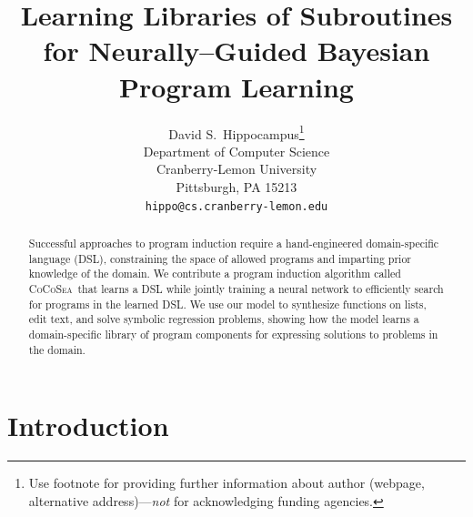 \documentclass{article}
\title{Learning Libraries of Subroutines for Neurally--Guided Bayesian Program Learning}
\author{
  David S.~Hippocampus\thanks{Use footnote for providing further
    information about author (webpage, alternative
    address)---\emph{not} for acknowledging funding agencies.} \\
  Department of Computer Science\\
  Cranberry-Lemon University\\
  Pittsburgh, PA 15213 \\
  \texttt{hippo@cs.cranberry-lemon.edu} \\
}
\newcommand{\system}{\textsc{CoCoSea}~}
\begin{document}

\maketitle

\begin{abstract}
  Successful approaches to program induction require a hand-engineered
  domain-specific language (DSL), constraining the space of allowed
  programs and imparting prior knowledge of the domain.  We contribute
  a program induction algorithm called \system that learns a DSL while
  jointly training a neural network to efficiently search for programs
  in the learned DSL.  We use our model to synthesize functions on lists,
  edit text, and solve symbolic regression problems, showing how the
  model learns a domain-specific library of program components for
  expressing solutions to problems in the domain.
\end{abstract}


\section{Introduction}
\end{document}
